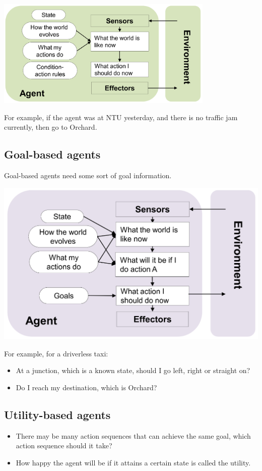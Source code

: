 \documentclass[11pt]{article}
\begin{document}
\begin{center}
\includegraphics[height=14em]{./images/reflex-agent-with-state-diagram.png}
\end{center}

For example, if the agent was at NTU yesterday, and there is no traffic jam currently, then go to Orchard.
\subsection{Goal-based agents}
\label{sec:org5e91085}
Goal-based agents need some sort of goal information.

\begin{center}
\includegraphics[width=.9\linewidth]{./images/goal-based-agent-diagram.png}
\end{center}

For example, for a driverless taxi:
\begin{itemize}
\item At a junction, which is a known state, should I go left, right or straight on?
\item Do I reach my destination, which is Orchard?
\end{itemize}

 \newpage
\subsection{Utility-based agents}
\label{sec:orga1d0fe5}
\begin{itemize}
\item There may be many action sequences that can achieve the same goal, which action sequence should it take?
\item How happy the agent will be if it attains a certain state is called the utility.
\end{itemize}
\end{document}
